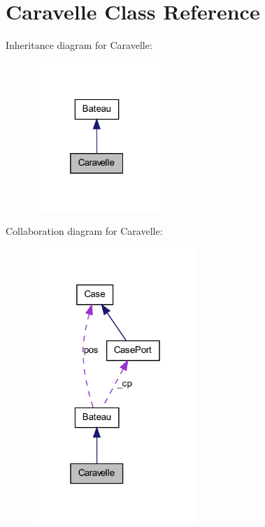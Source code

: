 \hypertarget{class_caravelle}{
\section{Caravelle Class Reference}
\label{class_caravelle}
}


Inheritance diagram for Caravelle:
\nopagebreak
\begin{figure}[H]
\begin{center}
\leavevmode
\includegraphics[width=136pt]{class_caravelle__inherit__graph}
\end{center}
\end{figure}


Collaboration diagram for Caravelle:
\nopagebreak
\begin{figure}[H]
\begin{center}
\leavevmode
\includegraphics[width=175pt]{class_caravelle__coll__graph}
\end{center}
\end{figure}
